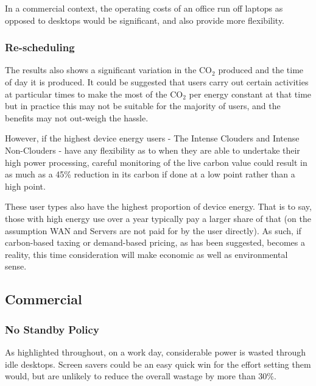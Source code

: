 \documentclass[conference]{IEEEtran}
\begin{document}

In a commercial context, the operating costs of an office run off
laptops as opposed to desktops would be significant, and also provide
more flexibility.

\subsubsection{Re-scheduling}

The results also shows a significant variation in the CO$_2$ produced and
the time of day it is produced. It could be suggested that users carry
out certain activities at particular times to make the most of the CO$_2$
per energy constant at that time but in practice this may not be
suitable for the majority of users, and the benefits may not out-weigh
the hassle.

However, if the highest device energy users - The Intense Clouders and
Intense Non-Clouders - have any flexibility as to when they are able
to undertake their high power processing, careful monitoring of the
live carbon value could result in as much as a 45\% reduction in its
carbon if done at a low point rather than a high point.

These user types also have the highest proportion of device
energy. That is to say, those with high energy use over a year
typically pay a larger share of that (on the assumption WAN and
Servers are not paid for by the user directly). As such, if
carbon-based taxing or demand-based pricing, as has been suggested,
becomes a reality, this time consideration will make economic as well
as environmental sense.

\subsection{Commercial}

\subsubsection{No Standby Policy}

As highlighted throughout, on a work day, considerable power is wasted
through idle desktops. Screen savers could be an easy quick win for
the effort setting them would, but are unlikely to reduce the overall
wastage by more than 30\%.
\end{document}
